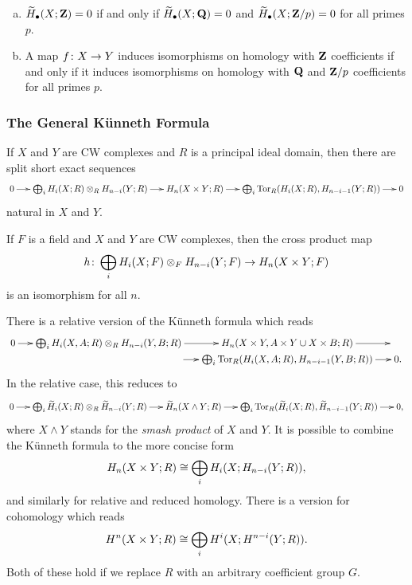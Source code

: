 \begin{corollary}
  \mbox{}
  \begin{enumerate}[(a)]
  \item $\widetilde{H}_\bullet(X;\mathbf{Z}) = 0$ if and only if $\widetilde{H}_\bullet(X;\mathbf{Q}) = 0$ and $\widetilde{H}_\bullet(X;\mathbf{Z}/p) = 0$ for all primes $p$.
  \item A map $f \colon X \rightarrow Y$ induces isomorphisms on homology with $\mathbf{Z}$ coefficients if and only if it induces isomorphisms on homology with $\mathbf{Q}$ and $\mathbf{Z}/p$ coefficients for all primes $p$.
  \end{enumerate}
\end{corollary}

\subsubsection{The General K\"unneth Formula}

\begin{theorem}
  If $X$ and $Y$ are CW complexes and $R$ is a principal ideal domain, then there are split short exact sequences
  \[\xymatrix@C=0.2in{
    0 \ar[r] & \bigoplus_i H_i(X;R) \otimes_R H_{n-i}(Y;R) \ar[r] & H_n(X \x Y; R) \ar[r] & \bigoplus_i \Tor_R(H_i(X;R),H_{n-i-1}(Y;R)) \ar[r] & 0
  }\]
  natural in $X$ and $Y$.
\end{theorem}

\begin{corollary}
  If $F$ is a field and $X$ and $Y$ are CW complexes, then the cross product map
  \[
  h \colon \bigoplus_i H_i(X;F) \otimes_F H_{n-i}(Y;F) \rightarrow H_n(X \times Y; F)
  \]
  is an isomorphism for all $n$.
\end{corollary}

There is a relative version of the K\"unneth formula which reads
\[\xymatrix@C=0.2in@R=0in{
  0 \ar[r] & \bigoplus_i H_i(X,A;R) \otimes_R H_{n-i}(Y,B;R) \ar[r] & H_n(X \x Y, A \x Y \cup X \x B; R) \ar[r] & \hspace{0.14in} \\
  & \hspace{2.03in} \ar[r] & \bigoplus_i \Tor_R(H_i(X,A;R),H_{n-i-1}(Y,B;R)) \ar[r] & 0.
}\]
In the relative case, this reduces to
\[\xymatrix@C=0.2in{
  0 \ar[r] & \bigoplus_i \wtilde{H}_i(X;R) \otimes_R \wtilde{H}_{n-i}(Y;R) \ar[r] & \wtilde{H}_n(X \wedge Y; R) \ar[r] & \bigoplus_i \Tor_R(\wtilde{H}_i(X;R),\wtilde{H}_{n-i-1}(Y;R)) \ar[r] & 0,
}\]
where $X \wedge Y$ stands for the \emph{smash product} of $X$ and $Y$. It is possible to combine the K\"unneth formula to the more concise form
\[
H_n(X \times Y; R) \cong \bigoplus_i H_i(X; H_{n-i}(Y;R)),
\]
and similarly for relative and reduced homology. There is a version for cohomology which reads
\[
H^n(X \times Y; R) \cong \bigoplus_i H^i(X; H^{n-i}(Y;R)).
\]
Both of these hold if we replace $R$ with an arbitrary coefficient group $G$.

